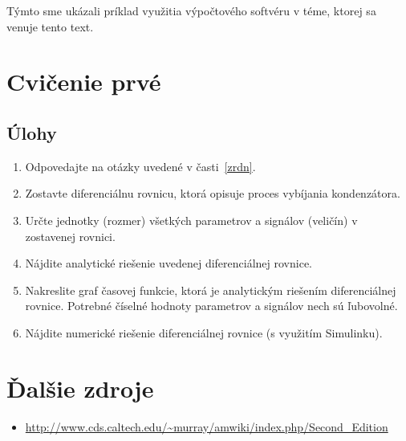 \documentclass[a4paper, 10pt, ]{article}
\begin{document}
Týmto sme ukázali príklad využitia výpočtového softvéru v téme, ktorej sa venuje tento text.














\section{Cvičenie prvé}


\subsection{Úlohy}

\begin{enumerate}[leftmargin=0pt, labelsep=4mm, itemsep=0pt]


    \item Odpovedajte na otázky uvedené v časti~\ref{zrdn}.

	\item Zostavte diferenciálnu rovnicu, ktorá opisuje proces vybíjania kondenzátora.

    \item Určte jednotky (rozmer) všetkých parametrov a signálov (veličín) v zostavenej rovnici.

    \item Nájdite analytické riešenie uvedenej diferenciálnej rovnice.

    \item Nakreslite graf časovej funkcie, ktorá je analytickým riešením diferenciálnej rovnice. Potrebné číselné hodnoty parametrov a signálov nech sú ľubovolné.

    \item Nájdite numerické riešenie diferenciálnej rovnice (s využitím Simulinku).

\end{enumerate}








\renewcommand{\refname}{Odporúčaná literatúra}

\nocite{*}
{}






\section*{Ďalšie zdroje}

\begin{itemize}[leftmargin=0pt, labelsep=3mm, itemsep=0pt]
    \item \url{http://www.cds.caltech.edu/~murray/amwiki/index.php/Second_Edition}
\end{itemize}
\end{document}
